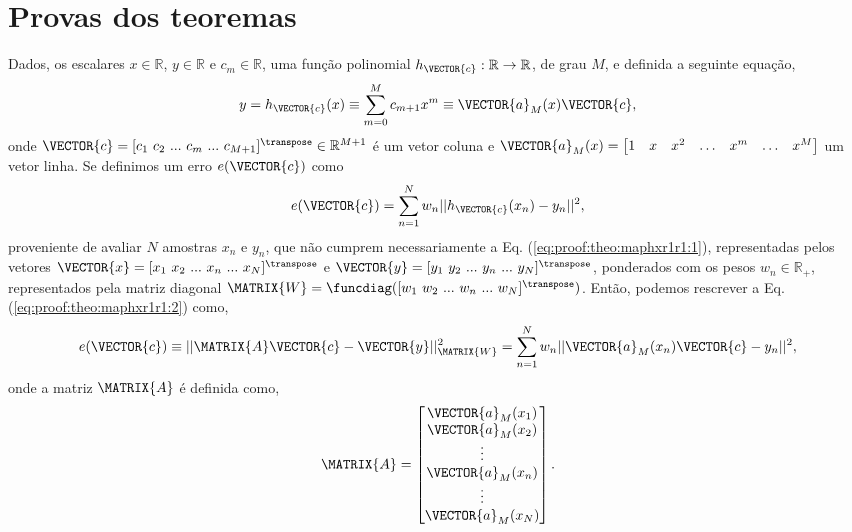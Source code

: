 \section{Provas dos teoremas}
 
\begin{myproofT}\label{proof:theo:maphxr1r1}
Dados,
os escalares $x \in \mathbb{R}$, $y \in \mathbb{R}$ e $c_m \in \mathbb{R}$,
uma função polinomial $h_{\VECTOR{c}}:\mathbb{R} \rightarrow \mathbb{R}$, de grau $M$, e 
definida a seguinte equação,
\begin{equation}\label{eq:proof:theo:maphxr1r1:1}
y=h_{\VECTOR{c}}(x)\equiv \sum_{m=0}^{M}c_{m+1} x^m\equiv \VECTOR{a}_M(x)\VECTOR{c},
\end{equation}
onde $\VECTOR{c}=[c_1~ c_2~ ...~ c_m~ ...~ c_{M+1}]^{\transpose} \in \mathbb{R}^{M+1}$ é um vetor coluna e
$\VECTOR{a}_M(x)=\begin{bmatrix} 
1& x& x^2& \hdots & x^m& \hdots& x^M
\end{bmatrix}$ um vetor linha.
Se definimos um erro $e(\VECTOR{c})$ como
\begin{equation}\label{eq:proof:theo:maphxr1r1:2}
e(\VECTOR{c}) =  \sum_{n=1}^{N} w_n||h_{\VECTOR{c}}(x_n)-y_n||^2,
\end{equation}
proveniente de avaliar $N$ amostras $x_n$ e $y_n$, 
que não cumprem necessariamente a Eq. (\ref{eq:proof:theo:maphxr1r1:1}), 
representadas pelos vetores $\VECTOR{x}=[x_1~ x_2~ ...~ x_n~ ...~ x_N]^{\transpose}$ e $\VECTOR{y}=[y_1~ y_2~ ...~ y_n~ ...~ y_N]^{\transpose}$,
ponderados com os pesos $w_n \in \mathbb{R}_+$, representados pela matriz diagonal $\MATRIX{W}=\funcdiag([w_1~ w_2~ ...~ w_n~ ...~ w_N]^{\transpose})$.
Então, podemos rescrever a Eq. (\ref{eq:proof:theo:maphxr1r1:2}) como,
\begin{equation}\label{eq:proof:theo:maphxr1r1:3}
e(\VECTOR{c}) \equiv ||\MATRIX{A}\VECTOR{c}-\VECTOR{y}||_{\MATRIX{W}}^2 =  \sum_{n=1}^{N} w_n||\VECTOR{a}_M(x_n)\VECTOR{c}-y_n||^2,
\end{equation}
onde a matriz $\MATRIX{A}$ é definida como,
\begin{equation}\label{eq:proof:maphxr1r1:4}
\MATRIX{A}=\begin{bmatrix}
\VECTOR{a}_M(x_1)\\
\VECTOR{a}_M(x_2)\\
\vdots\\
\VECTOR{a}_M(x_n)\\
\vdots\\
\VECTOR{a}_M(x_N)\\
\end{bmatrix}.
\end{equation}



\end{myproofT}
